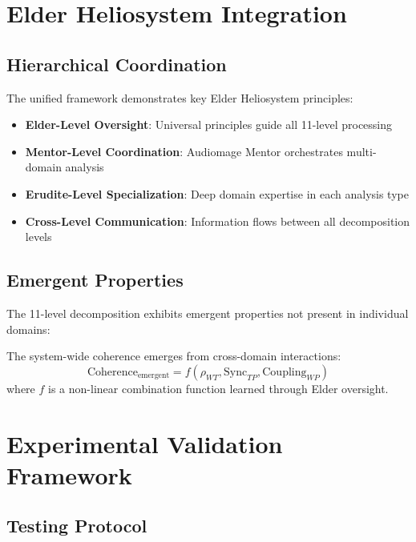 \section{Elder Heliosystem Integration}

\subsection{Hierarchical Coordination}

The unified framework demonstrates key Elder Heliosystem principles:

\begin{itemize}
    \item \textbf{Elder-Level Oversight}: Universal principles guide all 11-level processing
    \item \textbf{Mentor-Level Coordination}: Audiomage Mentor orchestrates multi-domain analysis
    \item \textbf{Erudite-Level Specialization}: Deep domain expertise in each analysis type
    \item \textbf{Cross-Level Communication}: Information flows between all decomposition levels
\end{itemize}

\subsection{Emergent Properties}

The 11-level decomposition exhibits emergent properties not present in individual domains:

\begin{definition}
The system-wide coherence emerges from cross-domain interactions:
\begin{equation}
\text{Coherence}_{\text{emergent}} = f(\rho_{WT}, \text{Sync}_{TP}, \text{Coupling}_{WP})
\end{equation}
where $f$ is a non-linear combination function learned through Elder oversight.
\end{definition}

\section{Experimental Validation Framework}

\subsection{Testing Protocol}

